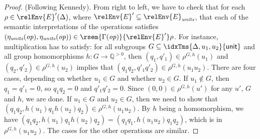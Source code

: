 \begin{proof}
  (Following Kennedy).  From right to left, we have to check that for
  each $\rho \in \relEnv{E}'(\Delta)$, where $\relEnv{E}' \subseteq
  \relEnv{E}_{\mathit{units}}$, that each of the semantic
  interpretations of the operations satisfies
  $(\eta_{\mathit{units}}(\mathit{op}),
  \eta_{\mathit{units}}(\mathit{op})) \in
  \rsem{\Gamma(\mathit{op})}{\relEnv{E}'}\rho$. For instance,
  multiplication has to satisfy: for all subgroups $G \subseteq
  \idxTms{\Delta,u_1,u_2}{\mathsf{unit}}$ and all group homomorphisms
  $h : G \to \mathbb{Q}^{>0}$, then $(q_1,q'_1) \in \rho^{G,h}(u_1)$
  and $(q_2,q'_2) \in \rho^{G,h}(u_2)$ implies that $(q_1q_2,q'_1q'_2)
  \in \rho^{G,h}(u_1u_2)$. There are four cases, depending on whether
  $u_1 \in G$ and whether $u_2 \in G$. If $u_1 \not\in G$, then $q_1 =
  q'_1 = 0$, so $q_1q_2 = 0$ and $q'_1q'_2 = 0$. Since $(0,0) \in
  \rho^{G,h}(u')$ for any $u'$, $G$ and $h$, we are done. If $u_1 \in
  G$ and $u_2 \in G$, then we need to show that $(q_1q_2,
  h(u_1)q_1h(u_2)q_2) \in \rho^{G,h}(u_1u_2)$. By $h$ being a
  homomorphism, we have $(q_1q_2, h(u_1)q_1h(u_2)q_2) = (q_1q_1,
  h(u_1u_2)q_1q_2)$, which is in $\rho^{G,h}(u_1u_2)$. The cases for
  the other operations are similar.


\end{proof}
